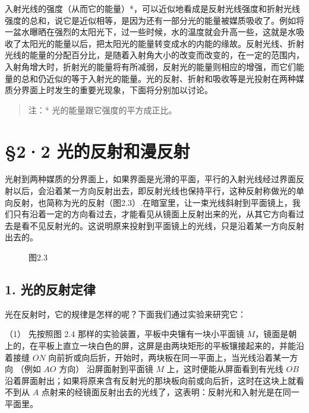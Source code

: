 入射光线的强度（从而它的能量）*，可以近似地看成是反射光线强度和折射光线强度的总和，说它是近似相等，是因为还有一部分光的能量被媒质吸收了。例如将一盆水曝晒在强烈的太阳光下，过一些时候，水的温度就会升高一些，这就是水吸收了太阳光的能量以后，把太阳光的能量转变成水的内能的缘故。反射光线、折射光线的能量的分配百分比，是随着入射角大小的改变而改变的，在一定的范围内，入射角增大时，折射光的能量将有所减弱，反射光的能量则相应的增强，而它们能量的总和仍近似的等于入射光的能量。光的反射、折射和吸收等是光投射在两种媒质分界面上时发生的重要光现象，下面将分别加以讨论。

\begin{quote}
注：* 光的能量跟它强度的平方成正比。
\end{quote}

\section{§2·2
光的反射和漫反射}

光射到两种媒质的分界面上，如果界面是光滑的平面，平行的入射光线经过界面反射以后，会沿着某一方向反射出去，即反射光线也保持平行，这种反射称做光的单向反射，也简称为光的反射（图2.3）.在暗室里，让一束光线斜射到平面镜上，我们只有沿着一定的方向看过去，才能看见从镜面上反射出来的光，从其它方向看过去是看不见反射光的。这说明原来投射到平面镜上的光线，只是沿着某一方向反射出去的。

\begin{figure}
\centering
\caption{图2.3}
\end{figure}

\subsection{1. 光的反射定律}

光在反射时，它的规律是怎样的呢？下面我们通过实验来研究它：

（1） 先按照图 2.4 那样的实验装置，平板中央镶有一块小平面镜
\(M\)，镜面是朝上的，在平板上直立一块白色的屏，这屏是由两块矩形的平板镶接起来的，并能沿着接缝
\(ON\) 向前折或向后折，开始时，两块板在同一平面上，当光线沿着某一方向
（例如 \(AO\) 方向） 沿屏面射到平面镜 \(M\) 上，这时便能从屏面看到有光线
\(OB\)
沿着屏面射出；如果将原来含有反射光的那块板向前或向后折，这时在这块上就看不到从
\(A\)
点射来的经镜面反射出去的光线了，这表明：反射光和入射光是在同一平面里。

